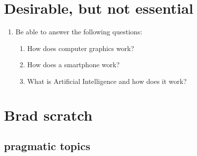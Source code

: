 \documentclass[draft]{article}
\begin{document}
\section{Desirable, but not essential}

\begin{enumerate}

\item Be able to answer the following questions: 

  \begin{enumerate}
    \item How does computer graphics work?
    \item How does a smartphone work?
    \item What is Artificial Intelligence and how does it work?
  \end{enumerate}

\end{enumerate}

\section*{Brad scratch}


\subsection{pragmatic topics}
\end{document}
